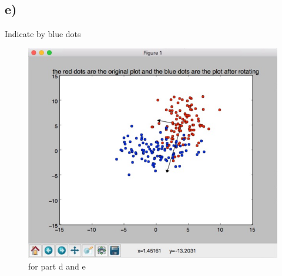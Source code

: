 \documentclass[11pt]{article}
\begin{document}
\subsection*{e)}
Indicate by blue dots
\begin{figure}[H]
\begin{center}
\includegraphics[scale=0.3]{q1g}
\caption{for part d and e}
\end{center}
\end{figure}
\newpage



\newpage
\end{document}
